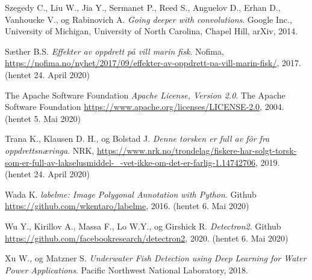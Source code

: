 \documentclass[11ot]{article}
\begin{document}
\begin{thebibliography}{9}
Szegedy C., Liu W., Jia Y., Sermanet P., Reed S., Anguelov D., Erhan D., Vanhoucke V., og Rabinovich A. 
\textit{Going deeper with convolutions}. 
Google Inc., University of Michigan, University of North Carolina, Chapel Hill, arXiv, 2014.

Sæther B.S. 
\textit{Effekter av oppdrett på vill marin fisk}. 
Nofima, \url{https://nofima.no/nyhet/2017/09/effekter-av-oppdrett-pa-vill-marin-fisk/}, 2017. (hentet 24. April 2020)

The Apache Software Foundation 
\textit{Apache License, Version 2.0}. 
The Apache Software Foundation \url{https://www.apache.org/licenses/LICENSE-2.0}, 2004. (hentet 5. Mai 2020)

Trana K., Klausen D. H., og Bolstad J. 
\textit{Denne torsken er full av fôr fra oppdrettsnæringa}. 
NRK, \url{https://www.nrk.no/trondelag/fiskere-har-solgt-torsk-som-er-full-av-lakselusmiddel-_-vet-ikke-om-det-er-farlig-1.14742706}, 2019. (hentet 24. April 2020)

Wada K.
\textit{labelme: Image Polygonal Annotation with Python}. 
Github \url{https://github.com/wkentaro/labelme}, 2016. (hentet 6. Mai 2020)

Wu Y., Kirillov A., Massa F., Lo W.Y., og Girshick R.
\textit{Detectron2}. 
Github \url{https://github.com/facebookresearch/detectron2}, 2020. (hentet 6. Mai 2020)

Xu W., og Matzner S. 
\textit{Underwater Fish Detection using Deep Learning for Water Power Applications}. 
Pacific Northwest National Laboratory, 2018.



\end{thebibliography}

\clearpage
\appendix


%
%
\end{document}
